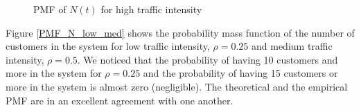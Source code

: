 \documentclass[12pt, a4paper]{article}
\begin{document}
\begin{figure}[H]
  \centering
  \hspace{0px}
  \caption{PMF of $N(t)$  for high traffic intensity}  
  \label{PMF_N_high}
\end{figure}

Figure \ref{PMF_N_low_med} shows the probability mass function of the number of
customers in the system for low traffic intensity, $\rho = 0.25$ and medium traffic
intensity, $\rho=0.5$. We noticed that the probability of having 10 customers and more in the 
system for $\rho=0.25$ and the probability of having 15 customers or more in the system is 
almost zero (negligible). The theoretical and the empirical PMF are in an excellent agreement 
with one another. 
\end{document}
